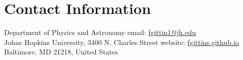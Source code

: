 \section{Contact Information}

Department of Physics and Astronomy
\hfill email: \href{mailto:fgittin1@jh.edu}{fgittin1@jh.edu} \\
%
Johns Hopkins University, 3400 N. Charles Street
\hfill website: \href{https://fgittins.github.io}{fgittins.github.io} \\
%
Baltimore, MD 21218, United States
